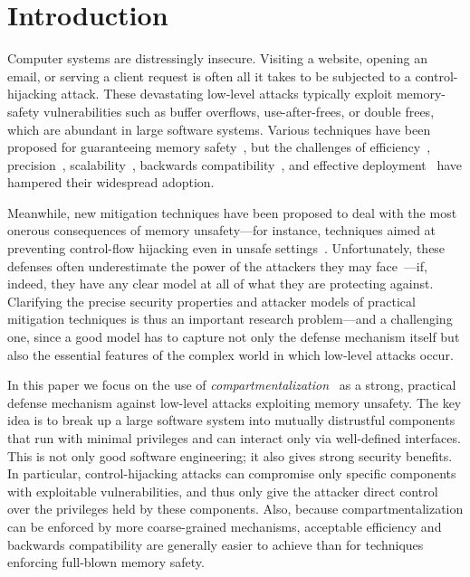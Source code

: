 \documentclass[10pt, conference, compsocconf, letterpaper, times]{IEEEtran}
\begin{document}
\section{Introduction}
\label{sec:intro}

Computer systems are distressingly insecure.
Visiting a website, opening an email, or serving a client request is often
all it takes to be subjected to a control-hijacking attack.
These devastating low-level attacks typically exploit memory-safety
vulnerabilities such as buffer overflows, use-after-frees, or double
frees, which are abundant in large software systems.
Various techniques have been
proposed for guaranteeing memory safety~\cite{NagarakatteZMZ09, NagarakatteZMZ10, DeviettiBMZ08,
  Nagarakatte2013, NagarakatteMZ14, NagarakatteMZ15,
  interlocks_ahns2012, micropolicies2015, LowFat2013}, but
the challenges of efficiency~\cite{NagarakatteZMZ09, NagarakatteZMZ10},
precision~\cite{m7}, scalability~\cite{ZitserLL04}, backwards
compatibility~\cite{cheri_asplos2015}, and effective
deployment~\cite{DeviettiBMZ08, Nagarakatte2013, NagarakatteMZ14,
  NagarakatteMZ15, interlocks_ahns2012, micropolicies2015, LowFat2013,
  pump_asplos2015}
have hampered their widespread adoption.

Meanwhile, new mitigation techniques have been proposed to deal with the most
onerous consequences of memory  unsafety---for instance, techniques
aimed at preventing
control-flow hijacking even in unsafe
settings~\cite{Abadi2005, AbadiBEL09, Erlingsson07, TiceRCCELP14, BurowCBPNLF16}.
Unfortunately, these defenses often underestimate the power of the attackers
they may face~\cite{Erlingsson07, SnowMDDLS13, outofcontrol_ieeesp2014,
  DaviSLM14, EvansLOSROS15, EvansFGOTSSRO15}---if, indeed, they have any
clear model at all of what they are protecting against.
Clarifying the precise security properties and
attacker models of practical mitigation techniques is thus an important
research problem---and a challenging one, since a good model has to capture
not only the defense mechanism itself but also the essential features of the
complex world in which low-level attacks occur.



In this paper we focus on the use of
{\em compartmentalization}~\cite{GudkaWACDLMNR15, cheri_oakland2015,
  wedge_nsdi2008} as a strong, practical defense mechanism
against low-level attacks exploiting memory unsafety.
The key idea is to break up a large software system into
mutually distrustful components that run with minimal
privileges and can interact only via well-defined interfaces.
This is not only good software engineering; it also gives strong security
benefits.  In particular, control-hijacking attacks can compromise only
specific components with exploitable vulnerabilities, and thus only give the
attacker direct control over the privileges held by these components.
Also, because compartmentalization can be enforced by more coarse-grained
mechanisms, acceptable efficiency and backwards compatibility are generally
easier to achieve than for techniques enforcing full-blown memory safety.
\end{document}

